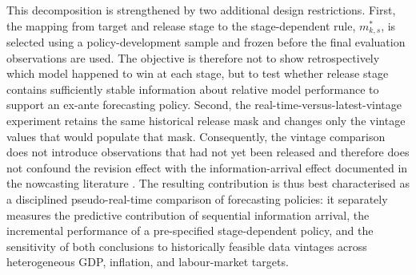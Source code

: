 This decomposition is strengthened by two additional design restrictions.
First, the mapping from target and release stage to the stage-dependent rule,
$m^{*}_{k,s}$, is selected using a policy-development sample and frozen before
the final evaluation observations are used. The objective is therefore not to
show retrospectively which model happened to win at each stage, but to test
whether release stage contains sufficiently stable information about relative
model performance to support an ex-ante forecasting policy. Second, the
real-time-versus-latest-vintage experiment retains the same historical release
mask and changes only the vintage values that would populate that mask.
Consequently, the vintage comparison does not introduce observations that had
not yet been released and therefore does not confound the revision effect with
the information-arrival effect documented in the nowcasting literature
\citep{croushorestark2001realtime,starkcroushore2002forecasting,
koenig2003useabuse}. The resulting contribution is thus best characterised as a
disciplined pseudo-real-time comparison of forecasting policies: it separately
measures the predictive contribution of sequential information arrival, the
incremental performance of a pre-specified stage-dependent policy, and the
sensitivity of both conclusions to historically feasible data vintages across
heterogeneous GDP, inflation, and labour-market targets.